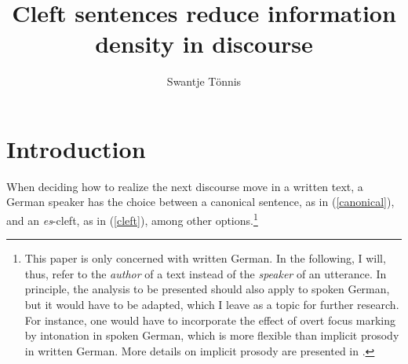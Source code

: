 \documentclass[output=paper,colorlinks,citecolor=brown]{langscibook}
\title{Cleft sentences reduce information density in discourse}
\author{Swantje Tönnis\orcid{0000-0002-1074-5706}\affiliation{University of Stuttgart}}
\begin{document}
\maketitle

\section{Introduction} \label{sec:6_intro}
When deciding how to realize the next discourse move in a written text, a German speaker has the choice between a canonical sentence, as in (\ref{canonical}), and an \textit{es}-cleft, as in (\ref{cleft}), among other options.\footnote{This paper is only concerned with written German. In the following, I will, thus, refer to the \textit{author} of a text instead of the \textit{speaker} of an utterance. In principle, the analysis to be presented should also apply to spoken German, but it would have to be adapted, which I leave as a topic for further research. For instance, one would have to incorporate the effect of overt focus marking by intonation in spoken German, which is more flexible than implicit prosody in written German. More details on implicit prosody are presented in .}
\z
%
\end{document}
